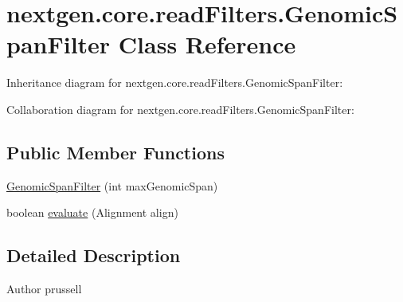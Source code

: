 \hypertarget{classnextgen_1_1core_1_1read_filters_1_1_genomic_span_filter}{\section{nextgen.\+core.\+read\+Filters.\+Genomic\+Span\+Filter Class Reference}
\label{classnextgen_1_1core_1_1read_filters_1_1_genomic_span_filter}
}


Inheritance diagram for nextgen.\+core.\+read\+Filters.\+Genomic\+Span\+Filter\+:


Collaboration diagram for nextgen.\+core.\+read\+Filters.\+Genomic\+Span\+Filter\+:
\subsection*{Public Member Functions}
\begin{DoxyCompactItemize}
\item 
\hyperlink{classnextgen_1_1core_1_1read_filters_1_1_genomic_span_filter_a1a9584b156a2ef42874cd4a46e271c6c}{Genomic\+Span\+Filter} (int max\+Genomic\+Span)
\item 
boolean \hyperlink{classnextgen_1_1core_1_1read_filters_1_1_genomic_span_filter_ac8bc4cbcbd922a47cf37248c5890e870}{evaluate} (Alignment align)
\end{DoxyCompactItemize}


\subsection{Detailed Description}
\begin{DoxyAuthor}{Author}
prussell 
\end{DoxyAuthor}



